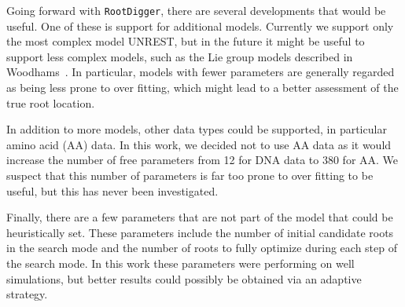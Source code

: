 \documentclass{article}
\newcommand{\RootDiggertt}{\texttt{RootDigger}}
\begin{document}
Going forward with \RootDiggertt{}, there are several developments that would be
useful. One of these is support for additional models. Currently we support only the
most complex model UNREST, but in the future it might be useful to support
less complex models, such as the Lie group models described in
Woodhams~\cite{woodhams_new_2015}.  In particular, models with fewer parameters
are generally regarded as being less prone to over fitting, which might lead to
a better assessment of the true root location.

In addition to more models, other data types could be supported, in particular
amino acid (AA) data. In this work, we decided not to use AA data as it would
increase the number of free parameters from 12 for DNA data to $380$ for AA. We
suspect that this number of parameters is far too prone to over fitting to be
useful, but this has never been investigated.

Finally, there are a few parameters that are not part of the model that could be
heuristically set. These parameters include the number of initial candidate
roots in the search mode and the number of roots to fully optimize during each
step of the search mode. In this work these parameters were performing on well
simulations, but better results could possibly be obtained via an adaptive
strategy.



\end{document}
